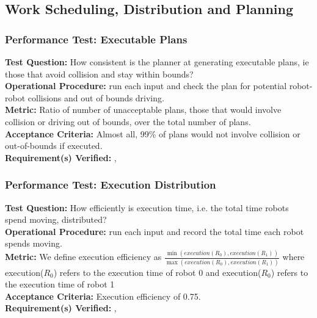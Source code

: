 
\subsection{Work Scheduling, Distribution and Planning}
\label{sec:verification_sdp}

\subsubsection{Performance Test: Executable Plans}
\label{test:sdp_pt_executable}
\textbf{Test Question:} How consistent is the planner at generating executable plans, ie those that avoid collision and stay within bounds? \\
\textbf{Operational Procedure:}  run each input and check the plan for potential robot-robot collisions and out of bounds driving. \\
\textbf{Metric:} Ratio of number of unacceptable plans, those that would involve collision or driving out of bounds, over the total number of plans. \\
\textbf{Acceptance Criteria:} Almost all, 99\% of plans would not involve collision or out-of-bounds if executed. \\
\textbf{Requirement(s) Verified:} , 

\subsubsection{Performance Test: Execution Distribution}
\label{test:sdp_pt_execu}
\textbf{Test Question:} How efficiently is execution time, i.e. the total time robots spend moving, distributed?\\
\textbf{Operational Procedure:}  run each input and record the total time each robot spends moving. \\
\textbf{Metric:} We define execution efficiency as $\frac{\min(execution(R_{0}), execution(R_{1}))}{\max(execution(R_{0}), execution(R_{1}))}$ where execution($R_{0}$) refers to the execution time of robot 0 and execution($R_{0}$) refers to the execution time of robot 1\\
\textbf{Acceptance Criteria:} Execution efficiency of 0.75.\\
\textbf{Requirement(s) Verified:} , 

